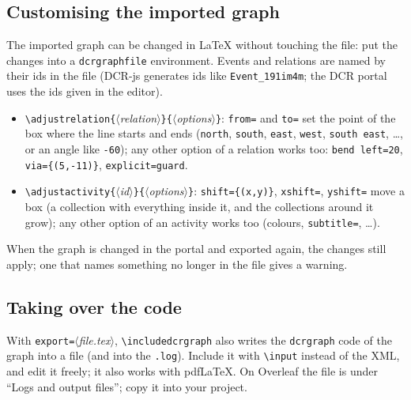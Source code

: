 \documentclass[a4paper,11pt]{article}
\newcommand\example[1]{%
  \begin{tcolorbox}[colback=white, colframe=black!25, boxrule=0.4pt,
      arc=1mm, left=2mm, right=2mm, halign lower=center]
    
    \tcblower
    
  \end{tcolorbox}}
\newcommand\cs[1]{\texttt{\textbackslash#1}}
\newcommand\key[1]{\texttt{#1}}
\newcommand\meta[1]{\ensuremath{\langle}\textit{#1}\ensuremath{\rangle}}
\newcommand\marg[1]{\texttt{\{}\meta{#1}\texttt{\}}}
\begin{document}
\subsection{Customising the imported graph}\label{sec:adjust}
The imported graph can be changed in \LaTeX{} without touching the file:
put the changes into a \texttt{dcrgraphfile} environment. Events and
relations are named by their ids in the file (DCR-js generates ids like
\texttt{Event\_191im4m}; the DCR portal uses the ids given in the editor).
\example{adjust}
\begin{itemize}
  \item \cs{adjustrelation}\marg{relation}\marg{options}: \key{from=} and
    \key{to=} set the point of the box where the line starts and ends
    (\key{north}, \key{south}, \key{east}, \key{west}, \key{south east},
    \dots, or an angle like \key{-60}); any other option of a relation
    works too: \key{bend left=20}, \key{via=\{(5,-11)\}}, \key{explicit=guard}.
  \item \cs{adjustactivity}\marg{id}\marg{options}: \key{shift=\{(x,y)\}},
    \key{xshift=}, \key{yshift=} move a box (a collection with everything
    inside it, and the collections around it grow); any other option of an
    activity works too (colours, \key{subtitle=}, \dots).
\end{itemize}
When the graph is changed in the portal and exported again, the changes
still apply; one that names something no longer in the file gives a warning.

\subsection{Taking over the code}
With \key{export=}\meta{file.tex}, \cs{includedcrgraph} also writes the
\texttt{dcrgraph} code of the graph into a file (and into the \texttt{.log}).
Include it with \cs{input} instead of the XML, and edit it freely; it
also works with pdf\LaTeX. On Overleaf the file is under ``Logs and output
files''; copy it into your project.
\end{document}
